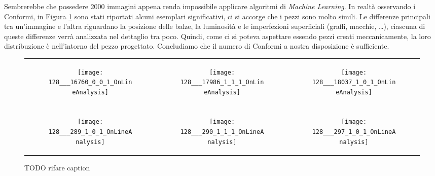 Sembrerebbe che possedere 2000 immagini appena renda impossibile applicare algoritmi di \textit{Machine Learning}.
In realtà osservando i Conformi, in Figura \ref{fig:esempi_conformi} sono stati riportati alcuni esemplari significativi, ci si accorge che i pezzi sono molto simili.
Le differenze principali tra un'immagine e l'altra riguardano la posizione delle balze, la luminosità e le imperfezioni superficiali (graffi, macchie, \dots), ciascuna di queste differenze verrà analizzata nel dettaglio tra poco.
Quindi, come ci si poteva aspettare essendo pezzi creati meccanicamente, la loro distribuzione è nell'intorno del pezzo progettato.
Concludiamo che il numero di Conformi a nostra disposizione è sufficiente.

\begin{figure}[ht] %
  \begin{center}
    \begin{tabular}{ccc}

  \begin{subfigure}{.3\linewidth}
    \centering\texttt{[image: 128\_\_\_16760\_0\_0\_1\_OnLineAnalysis]}
    \caption{}
  \end{subfigure} &

  \begin{subfigure}{.3\linewidth}
      \texttt{[image: 128\_\_\_17986\_1\_1\_1\_OnLineAnalysis]}
      \caption{}
    \end{subfigure} &

  \begin{subfigure}{.3\linewidth}
      \texttt{[image: 128\_\_\_18037\_1\_0\_1\_OnLineAnalysis]}
      \caption{}
    \end{subfigure} \\ \\

  \begin{subfigure}{.3\linewidth}
      \texttt{[image: 128\_\_\_289\_1\_0\_1\_OnLineAnalysis]}
      \caption{}
    \end{subfigure} &

  \begin{subfigure}{.3\linewidth}
      \texttt{[image: 128\_\_\_290\_1\_1\_1\_OnLineAnalysis]}
      \caption{}
    \end{subfigure} &

    \begin{subfigure}{.3\linewidth}
      \texttt{[image: 128\_\_\_297\_1\_0\_1\_OnLineAnalysis]}
      \caption{}
    \end{subfigure} \\

    \end{tabular}
    \caption{TODO rifare caption}
    \label{fig:esempi_conformi}
  \end{center}
\end{figure}

